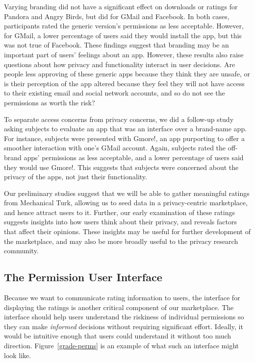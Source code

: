 \documentclass[11pt]{article}
\newcommand{\reffig}[1]{Figure~\ref{#1}}
\begin{document}
Varying branding did not have a significant effect on downloads or
ratings for Pandora and Angry Birds, but did 
for GMail and Facebook. In both cases,
participants rated the generic version's permissions as less
acceptable. However, for GMail, a lower percentage of users said they
would install the app, but this was not true of Facebook.  These
findings suggest that branding may be an important part of users'
feelings about an app. However, these results also raise questions
about how privacy and functionality interact in user decisions. Are
people less approving of these generic apps because they think they
are unsafe, or is their perception of the app altered because they 
feel they will not have access to their
existing email and social network accounts, 
and so do not see the permissions as worth the risk?

To separate access concerns from privacy concerns, we did a follow-up
study asking subjects to evaluate an app that was an
interface over a brand-name app. For instance,
subjects were presented with Gmore!, an app purporting to offer a
smoother interaction with one's GMail account. Again, subjects rated
the off-brand apps' permissions as less acceptable, and a lower
percentage of users said they would use Gmore!. This suggests that
subjects were concerned about the privacy of the apps, not just their
functionality.

Our preliminary studies suggest that we will be able to gather
meaningful ratings from Mechanical Turk, allowing us
to seed data in a privacy-centric marketplace, and hence attract users
to it. Further, our early examination of these ratings 
suggests insights into how users think about their privacy, and reveals
factors that affect their opinions. These insights may be useful for
further development of the marketplace, and may also be more broadly
useful to the privacy research community.

\subsection{The Permission User Interface}
\label{subsec-perm-ui}

Because we want to communicate rating information to users,
the interface for displaying the ratings is another critical component of 
our marketplace. The interface should help users understand the 
riskiness of individual permissions so they can make \emph{informed}
decisions without requiring significant
effort. Ideally, it would be 
intuitive enough that users could understand it without too 
much direction. \reffig{grade-perms} is an example of what such an interface
might look like.
\end{document}
